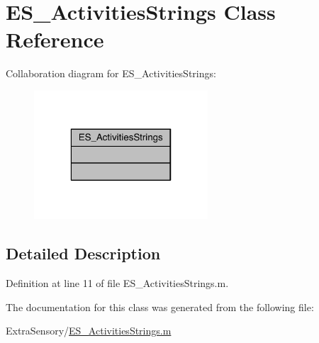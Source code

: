 \hypertarget{class_e_s___activities_strings}{\section{E\+S\+\_\+\+Activities\+Strings Class Reference}
\label{class_e_s___activities_strings}
}


Collaboration diagram for E\+S\+\_\+\+Activities\+Strings\+:\nopagebreak
\begin{figure}[H]
\begin{center}
\leavevmode
\includegraphics[width=184pt]{db/d62/class_e_s___activities_strings__coll__graph}
\end{center}
\end{figure}


\subsection{Detailed Description}


Definition at line 11 of file E\+S\+\_\+\+Activities\+Strings.\+m.



The documentation for this class was generated from the following file\+:\begin{DoxyCompactItemize}
\item 
Extra\+Sensory/\hyperlink{_e_s___activities_strings_8m}{E\+S\+\_\+\+Activities\+Strings.\+m}\end{DoxyCompactItemize}
